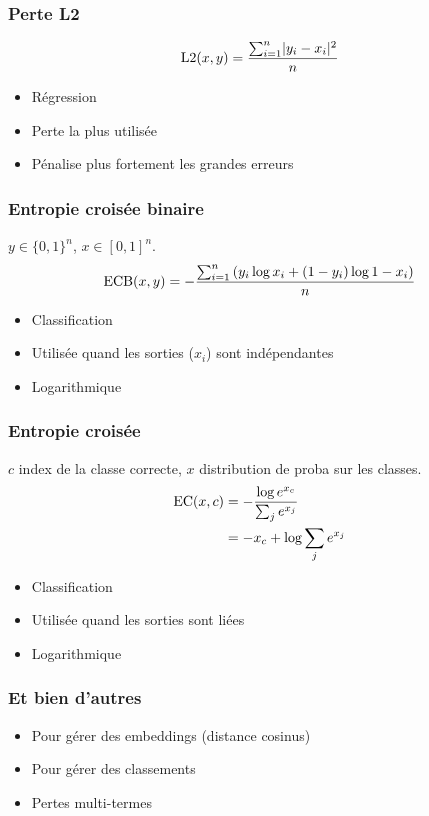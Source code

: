 \documentclass{formation}
\begin{document}
\begin{frame}
  \frametitle{Perte L2}
  \[
    \L2(x, y) = \frac{\sum_{i = 1}^n \lvert y_i - x_i \lvert^2}{n}
  \]
  \begin{itemize}
  \item Régression
  \item Perte la plus utilisée
  \item Pénalise plus fortement les grandes erreurs
  \end{itemize}
\end{frame}

\begin{frame}
  \frametitle{Entropie croisée binaire}
  $y \in \{0, 1\}^n$, $x \in [0,1]^n$.
  \[
    \ECB(x, y) = -\frac{\sum_{i=1}^n\left(y_i\log x_i + (1 - y_i)\log 1 - x_i\right)}{n}
  \]
    
  \begin{itemize}
  \item Classification
  \item Utilisée quand les sorties ($x_i$) sont indépendantes
  \item Logarithmique
  \end{itemize}
\end{frame}

\begin{frame}
  \frametitle{Entropie croisée}
  $c$ index de la classe correcte, $x$ distribution de proba sur les classes.
  \begin{align*}
    \EC(x, c) & = -\frac{\log e^{x_c}}{\sum_j e^{x_j}} \\
              & = -x_c + \log\sum_j e^{x_j} \\
  \end{align*}
  
  \begin{itemize}
  \item Classification
  \item Utilisée quand les sorties sont liées
  \item Logarithmique
  \end{itemize}
\end{frame}

\begin{frame}
  \frametitle{Et bien d'autres}
  \begin{itemize}
  \item Pour gérer des embeddings (distance cosinus)
  \item Pour gérer des classements
  \item Pertes multi-termes
  \end{itemize}
\end{frame}
\end{document}
